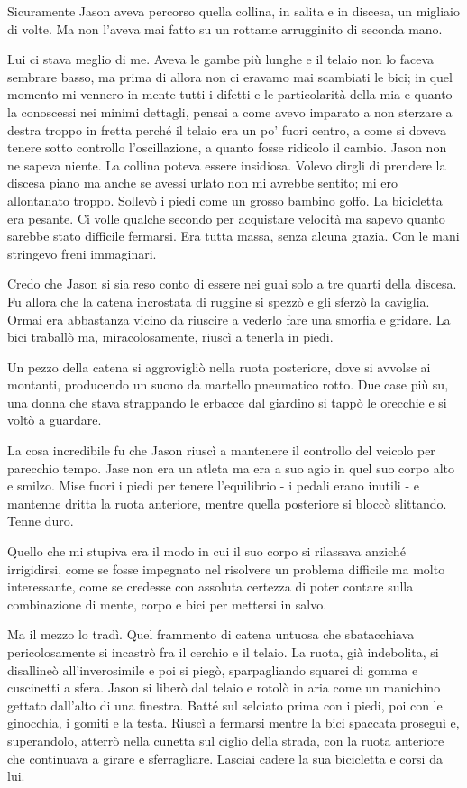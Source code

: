 Sicuramente Jason aveva percorso quella collina, in salita e in discesa,
un migliaio di volte. Ma non l'aveva mai fatto su un rottame arrugginito
di seconda mano.

Lui ci stava meglio di me. Aveva le gambe più lunghe e il telaio non lo
faceva sembrare basso, ma prima di allora non ci eravamo mai scambiati
le bici; in quel momento mi vennero in mente tutti i difetti e le
particolarità della mia e quanto la conoscessi nei minimi dettagli,
pensai a come avevo imparato a non sterzare a destra troppo in fretta
perché il telaio era un po' fuori centro, a come si doveva tenere sotto
controllo l'oscillazione, a quanto fosse ridicolo il cambio. Jason non
ne sapeva niente. La collina poteva essere insidiosa. Volevo dirgli di
prendere la discesa piano ma anche se avessi urlato non mi avrebbe
sentito; mi ero allontanato troppo. Sollevò i piedi come un grosso
bambino goffo. La bicicletta era pesante. Ci volle qualche secondo per
acquistare velocità ma sapevo quanto sarebbe stato difficile fermarsi.
Era tutta massa, senza alcuna grazia. Con le mani stringevo freni
immaginari.

Credo che Jason si sia reso conto di essere nei guai solo a tre quarti
della discesa. Fu allora che la catena incrostata di ruggine si spezzò e
gli sferzò la caviglia. Ormai era abbastanza vicino da riuscire a
vederlo fare una smorfia e gridare. La bici traballò ma,
miracolosamente, riuscì a tenerla in piedi.

Un pezzo della catena si aggrovigliò nella ruota posteriore, dove si
avvolse ai montanti, producendo un suono da martello pneumatico rotto.
Due case più su, una donna che stava strappando le erbacce dal giardino
si tappò le orecchie e si voltò a guardare.

La cosa incredibile fu che Jason riuscì a mantenere il controllo del
veicolo per parecchio tempo. Jase non era un atleta ma era a suo agio in
quel suo corpo alto e smilzo. Mise fuori i piedi per tenere l'equilibrio
- i pedali erano inutili - e mantenne dritta la ruota anteriore, mentre
quella posteriore si bloccò slittando. Tenne duro.

Quello che mi stupiva era il modo in cui il suo corpo si rilassava
anziché irrigidirsi, come se fosse impegnato nel risolvere un problema
difficile ma molto interessante, come se credesse con assoluta certezza
di poter contare sulla combinazione di mente, corpo e bici per mettersi
in salvo.

Ma il mezzo lo tradì. Quel frammento di catena untuosa che sbatacchiava
pericolosamente si incastrò fra il cerchio e il telaio. La ruota, già
indebolita, si disallineò all'inverosimile e poi si piegò, sparpagliando
squarci di gomma e cuscinetti a sfera. Jason si liberò dal telaio e
rotolò in aria come un manichino gettato dall'alto di una finestra.
Batté sul selciato prima con i piedi, poi con le ginocchia, i gomiti e
la testa. Riuscì a fermarsi mentre la bici spaccata proseguì e,
superandolo, atterrò nella cunetta sul ciglio della strada, con la ruota
anteriore che continuava a girare e sferragliare. Lasciai cadere la sua
bicicletta e corsi da lui.


